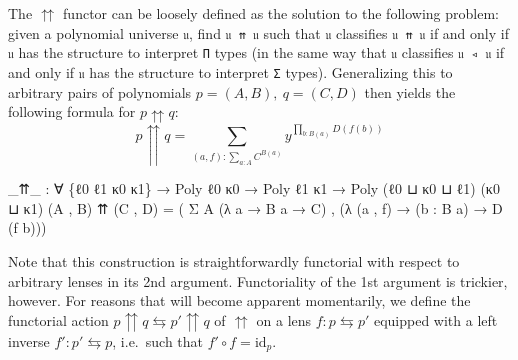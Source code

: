 \documentclass[
  11pt,
  oneside,
  article]{memoir}
\newenvironment{Shaded}{}{}
\newcommand{\NormalTok}[1]{#1}
\newcommand{\OtherTok}[1]{\textcolor[rgb]{0.00,0.44,0.13}{#1}}
\theoremstyle{definition}
\theoremstyle{plain}
\newcommand{\0}{\textsf{0}}
\newcommand{\1}{\tn{\textsf{1}}}
\begin{document}
The \(\upuparrows\) functor can be loosely defined as the solution to
the following problem: given a polynomial universe \texttt{𝔲}, find
\texttt{𝔲\ ⇈\ 𝔲} such that \texttt{𝔲} classifies \texttt{𝔲\ ⇈\ 𝔲} if and
only if \texttt{𝔲} has the structure to interpret \texttt{Π} types (in
the same way that \texttt{𝔲} classifies \texttt{𝔲\ ◃\ 𝔲} if and only if
\texttt{𝔲} has the structure to interpret \texttt{Σ} types).
Generalizing this to arbitrary pairs of polynomials
\(p = (A , B), ~ q = (C , D)\) then yields the following formula for
\(p \upuparrows q\): \[
p \upuparrows q = \sum_{(a , f) : \sum_{a : A} C^{B(a)}} y^{\prod_{b : B(a)} D(f(b))}
\]

\begin{Shaded}
\begin{Highlighting}[]
\OtherTok{\_}\NormalTok{⇈}\OtherTok{\_} \OtherTok{:} \OtherTok{∀} \OtherTok{\{}\NormalTok{ℓ0 ℓ1 κ0 κ1}\OtherTok{\}} \OtherTok{→}\NormalTok{ Poly ℓ0 κ0 }\OtherTok{→}\NormalTok{ Poly ℓ1 κ1 }
      \OtherTok{→}\NormalTok{ Poly }\OtherTok{(}\NormalTok{ℓ0 ⊔ κ0 ⊔ ℓ1}\OtherTok{)} \OtherTok{(}\NormalTok{κ0 ⊔ κ1}\OtherTok{)}
\OtherTok{(}\NormalTok{A , B}\OtherTok{)}\NormalTok{ ⇈ }\OtherTok{(}\NormalTok{C , D}\OtherTok{)} \OtherTok{=} 
    \OtherTok{(}\NormalTok{ Σ A }\OtherTok{(λ}\NormalTok{ a }\OtherTok{→}\NormalTok{ B a }\OtherTok{→}\NormalTok{ C}\OtherTok{)} 
\NormalTok{    , }\OtherTok{(λ} \OtherTok{(}\NormalTok{a , f}\OtherTok{)} \OtherTok{→} \OtherTok{(}\NormalTok{b }\OtherTok{:}\NormalTok{ B a}\OtherTok{)} \OtherTok{→}\NormalTok{ D }\OtherTok{(}\NormalTok{f b}\OtherTok{)))}
\end{Highlighting}
\end{Shaded}

Note that this construction is straightforwardly functorial with respect
to arbitrary lenses in its 2nd argument. Functoriality of the 1st
argument is trickier, however. For reasons that will become apparent
momentarily, we define the functorial action
\(p \upuparrows q \leftrightarrows p' \upuparrows q\) of \(\upuparrows\)
on a lens \(f : p \leftrightarrows p'\) equipped with a left inverse
\(f' : p' \leftrightarrows p\), i.e.~such that
\(f' \circ f = \text{id}_p\).
\end{document}
